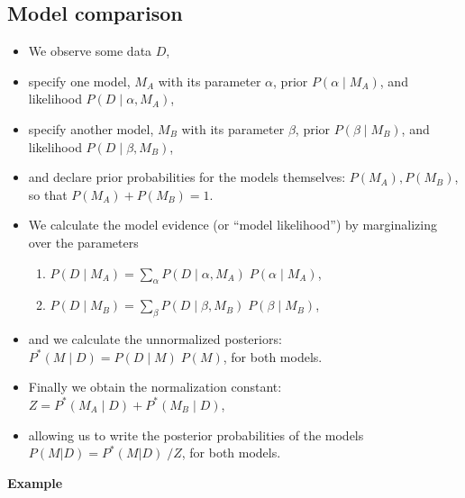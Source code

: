 \subsection{Model comparison}
\begin{itemize}
	\item We observe some data $D$,
	\item specify one model, $M_A$ with its parameter $\alpha$, prior $P(\alpha\;|\; M_A)$, and likelihood $P(D\;|\;\alpha, M_A)$,
	\item specify another model, $M_B$ with its parameter $\beta$, prior $P(\beta\;|\; M_B)$, and likelihood $P(D\;|\;\beta, M_B)$,
	\item and declare prior probabilities for the models themselves: $P(M_A), P(M_B)$, so that $P(M_A) + P(M_B) = 1$.
	\item We calculate the model evidence (or ``model likelihood'') by marginalizing over the parameters 
	\begin{enumerate}
		\item $P(D\;|\;M_A) = \sum_\alpha P(D\;|\;\alpha, M_A) \;P(\alpha\;|\;M_A)$,
		\item $P(D\;|\;M_B) = \sum_\beta P(D\;|\;\beta, M_B) \;P(\beta\;|\;M_B)$,
	\end{enumerate}
	\item and we calculate the unnormalized posteriors: $P^\ast(M\;|\;D) = P(D\;|\;M) \; P(M)$, for both models.
	\item Finally we obtain the normalization constant: $Z = P^\ast(M_A\;|\;D) + P^\ast(M_B\;|\;D)$,
	\item allowing us to write the posterior probabilities of the models $P(M|D) = P^\ast(M|D) \;/ Z$, for both models.
\end{itemize}
{\bf Example}

